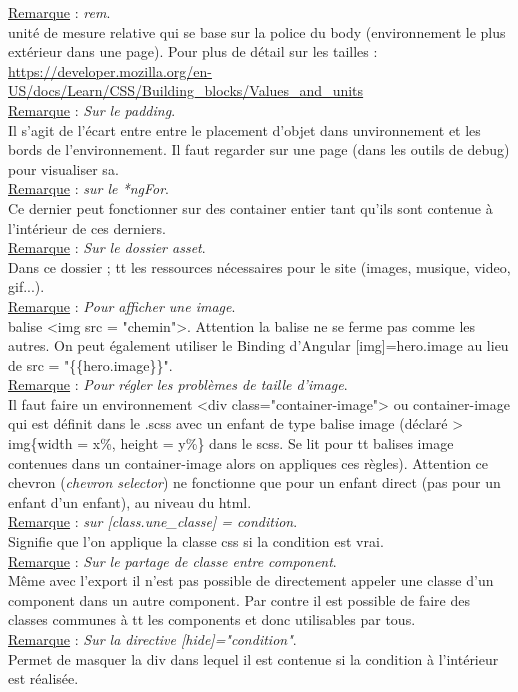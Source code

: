 \documentclass[a4paper,12pt,twoside]{article}
\newcommand{\incode}[1]{{\footnotesize\ttfamily #1}} %
\newcommand{\rem}[2]{\noindent\underline{Remarque} : \textit{#1}.\\ \indent #2}
\begin{document}
\rem{rem}{unité de mesure relative qui se base sur la police du body (environnement le plus extérieur dans une page). Pour plus de détail sur les tailles : \url{https://developer.mozilla.org/en-US/docs/Learn/CSS/Building_blocks/Values_and_units}}\\

\rem{Sur le padding}{Il s'agit de l'écart entre entre le placement d'objet dans unvironnement et les bords de l'environnement. Il faut regarder sur une page (dans les outils de debug) pour visualiser sa.}\\

\rem{sur le *ngFor}{Ce dernier peut fonctionner sur des container entier tant qu'ils sont contenue à l'intérieur de ces derniers.}\\

\rem{Sur le dossier \incode{asset}}{Dans ce dossier ; tt les ressources nécessaires pour le site (images, musique, video, gif...).}\\

\rem{Pour afficher une image}{balise <img src = "chemin">. Attention la balise ne se ferme pas comme les autres. On peut également utiliser le Binding d'Angular [img]=hero.image au lieu de src = "\{\{hero.image\}\}".}\\

\rem{Pour régler les problèmes de taille d'image}{Il faut faire un environnement <div class="container-image"> ou container-image qui est définit dans le .scss avec un enfant de type balise image (déclaré > img\{width = x\%, height = y\%\} dans le scss. Se lit pour tt balises image contenues dans un container-image alors on appliques ces règles). Attention ce chevron (\textit{chevron selector}) ne fonctionne que pour un enfant direct (pas pour un enfant d'un enfant), au niveau du html.}\\

\rem{sur [class.une\_classe] = condition}{Signifie que l'on applique la classe css si la condition est vrai.}\\

\rem{Sur le partage de classe entre component}{Même avec l'export il n'est pas possible de directement appeler une classe d'un component dans un autre component. Par contre il est possible de faire des classes communes à tt les components et donc utilisables par tous.}\\

\rem{Sur la directive [hide]="condition"}{Permet de masquer la div dans lequel il est contenue si la condition à l'intérieur est réalisée.}\\
\end{document}

